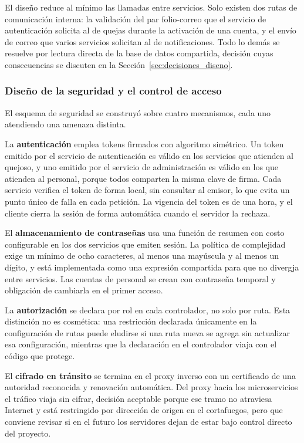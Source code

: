 	El diseño reduce al mínimo las llamadas entre servicios. Solo existen dos rutas de comunicación
	interna: la validación del par folio-correo que el servicio de autenticación solicita al de
	quejas durante la activación de una cuenta, y el envío de correo que varios servicios solicitan
	al de notificaciones. Todo lo demás se resuelve por lectura directa de la base de datos
	compartida, decisión cuyas consecuencias se discuten en la
	Sección~\ref{sec:decisiones_diseno}.
	
	\subsubsection{Diseño de la seguridad y el control de acceso}
	El esquema de seguridad se construyó sobre cuatro mecanismos, cada uno atendiendo una amenaza
	distinta.
	
	La \textbf{autenticación} emplea tokens firmados con algoritmo simétrico. Un token emitido por
	el servicio de autenticación es válido en los servicios que atienden al quejoso, y uno emitido
	por el servicio de administración es válido en los que atienden al personal, porque todos
	comparten la misma clave de firma. Cada servicio verifica el token de forma local, sin consultar
	al emisor, lo que evita un punto único de falla en cada petición. La vigencia del token es de
	una hora, y el cliente cierra la sesión de forma automática cuando el servidor la rechaza.
	
	El \textbf{almacenamiento de contraseñas} usa una función de resumen con costo configurable en
	los dos servicios que emiten sesión. La política de complejidad exige un mínimo de ocho
	caracteres, al menos una mayúscula y al menos un dígito, y está implementada como una expresión
	compartida para que no divergja entre servicios. Las cuentas de personal se crean con contraseña
	temporal y obligación de cambiarla en el primer acceso.
	
	La \textbf{autorización} se declara por rol en cada controlador, no solo por ruta. Esta
	distinción no es cosmética: una restricción declarada únicamente en la configuración de rutas
	puede eludirse si una ruta nueva se agrega sin actualizar esa configuración, mientras que la
	declaración en el controlador viaja con el código que protege.
	
	El \textbf{cifrado en tránsito} se termina en el proxy inverso con un certificado de una
	autoridad reconocida y renovación automática. Del proxy hacia los microservicios el tráfico
	viaja sin cifrar, decisión aceptable porque ese tramo no atraviesa Internet y está restringido
	por dirección de origen en el cortafuegos, pero que conviene revisar si en el futuro los
	servidores dejan de estar bajo control directo del proyecto.
	
